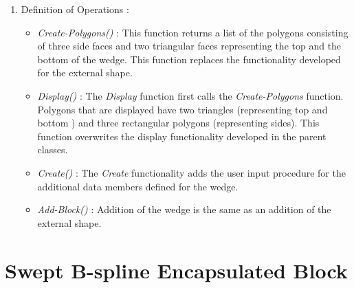 \begin{enumerate}
	\item
	Definition of Operations :

		\begin{itemize}
		\item
		{\em Create-Polygons()} : This function returns a list of the polygons 
		consisting
		of three side faces and two triangular faces representing the top
		and the bottom of the wedge. This function replaces the functionality
		developed for the external shape.

		\item
		{\em Display()} :
		The {\em Display} function first calls the {\em Create-Polygons} 
		function. Polygons that are
		displayed have two triangles (representing top and bottom ) and
		three rectangular polygons (representing sides). This function
		overwrites the display functionality developed in the parent classes.
		\item
		{\em Create()} : The {\em Create} functionality adds the user input 
		procedure for the additional data members defined for the wedge.
		\item
		{\em Add-Block()} : Addition of the wedge is the same as an 
		addition of the external shape.
		\end{itemize}
	\end{enumerate}

    \section{Swept B-spline Encapsulated Block}

